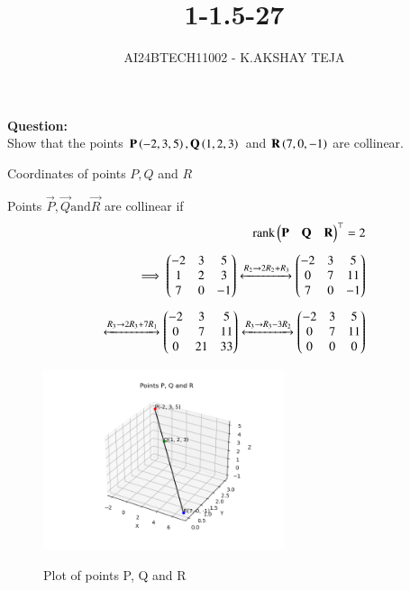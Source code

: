 \documentclass[journal]{IEEEtran}
\begin{document}

\vspace{3cm}

\title{1-1.5-27}
\author{AI24BTECH11002 - K.AKSHAY TEJA}
{\let\newpage\relax\maketitle}

\renewcommand{\thefigure}{\theenumi}
\renewcommand{\thetable}{\theenumi}
\setlength{\intextsep}{10pt} %


\renewcommand{\thetable}{\theenumi}

\textbf{Question:}\\
Show that the points $\mathbf{P}\left(-2,3,5\right),\mathbf{Q}\left(1,2,3\right)$ and $\mathbf{R}\left(7,0,-1\right)$ are collinear.
    

 \solution
 \begin{table}[h!]
	 \centering
	  
	 \caption{Coordinates of points $P,Q$ and $R$}
	 \label{tab:Coordinates}
\end{table}

Points $\vec{P},\vec{Q} \text{and} \vec{R}$ are collinear if 
\begin{align}
	\text{rank}\begin{pmatrix}\mathbf{P} & \mathbf{Q} & \mathbf{R}\end{pmatrix}^\top = 2\\[5pt]
	\implies \begin{pmatrix}-2 & 3 & 5\\1 & 2 & 3\\7 & 0 & -1\end{pmatrix}\xleftrightarrow[]{R_2 \rightarrow 2R_2 + R_3} \begin{pmatrix}-2 & 3 & 5\\0 & 7 & 11\\7 & 0 & -1\end{pmatrix}\\[5pt]
	\xleftrightarrow[]{R_3 \rightarrow 2R_3 + 7R_1} \begin{pmatrix}-2 & 3 & 5\\0 &7 & 11\\0 & 21 & 33\end{pmatrix} \xleftrightarrow[]{R_3 \rightarrow R_3 - 3R_2} \begin{pmatrix}-2 & 3 & 5\\0 & 7 & 11\\0 & 0 & 0\end{pmatrix}
\end{align}
	\begin{figure}[h!]    
	  \begin{center}
		\includegraphics[width=0.63\textwidth]{fig/fig.png}
		\label{Graph}
		  \caption{Plot of points P, Q and R}  
	 \end{center}	  
	\end{figure}
\end{document}
